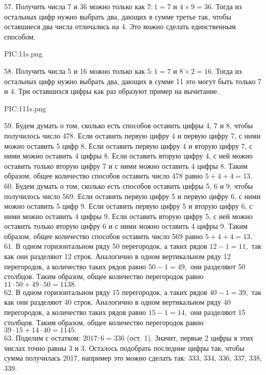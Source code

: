 57. Получить числа 7 и 36 можно только как $7:1=7$ и $4\times9=36.$ Тогда из остальных цифр нужно выбрать два, дающих в сумме третье так, чтобы оставшиеся два числа отличались на 4. Это можно сделать единственным способом.
\begin{center}
{{PIC:11s.png}}
\end{center}
58. Получить числа 5 и 16 можно только как $5:1=7$ и $8\times2=16.$ Тогда из остальных цифр нужно выбрать два, дающих в сумме 11 это могут быть только 7 и 4. Три оставшихся цифры как раз образуют пример на вычитание.
\begin{center}
{{PIC:111s.png}}
\end{center}
59. Будем думать о том, сколько есть способов оставить цифры 4, 7 и 8, чтобы получилось число 478. Если оставить первую цифру 4 и первую цифру 7, с ними можно оставить 5 цифр 8. Если оставить первую цифру 4 и вторую цифру 7, с ними можно оставить 4 цифры 8. Если оставить вторую цифру 4, с ней можно оставить только вторую цифру 7 и с ними можно оставить 4 цифры 8. Таким образом, общее количество способов оставить число 478 равно $5+4+4=13.$\\
60. Будем думать о том, сколько есть способов оставить цифры 5, 6 и 9, чтобы получилось число 569. Если оставить первую цифру 5 и первую цифру 6, с ними можно оставить 5 цифр 9. Если оставить первую цифру 5 и вторую цифру 6, с ними можно оставить 4 цифры 9. Если оставить вторую цифру 5, с ней можно оставить только вторую цифру 6 и с ними можно оставить 4 цифры 9. Таким образом, общее количество способов оставить число 569 равно $5+4+4=13.$\\
61. В одном горизонтальном ряду 50 перегородок, а таких рядов $12-1=11,$ так как они разделяют 12 строк. Аналогично в одном вертикальном ряду 12 перегородок, а количество таких рядов равно $50-1=49,$ они разделяют 50 столбцов. Таким образом, общее количество перегородок равно $11\cdot50+49\cdot50=1138.$\\
62. В одном горизонтальном ряду 15 перегородок, а таких рядов $40-1=39,$ так как они разделяют 40 строк. Аналогично в одном вертикальном ряду 40 перегородок, а количество таких рядов равно $15-1=14,$ они разделяют 15 столбцов. Таким образом, общее количество перегородок равно $39\cdot15+14\cdot40=1145.$\\
63. Поделим с остатком: $2017:6=336$ (ост. 1). Значит, первые 2 цифры в этих числах точно равны 3 и 3. Осталось подобрать последние цифры так, чтобы сумма получилась 2017, например это можно сделать так: 333, 334, 336, 337, 338, 339.\\
